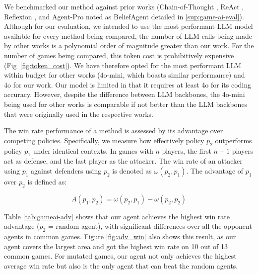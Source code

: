 We benchmarked our method against prior works (Chain-of-Thought \cite{CoT}, ReAct \cite{yao_react_2023}, Reflexion \cite{shinn_reflexion_2023}, and Agent-Pro noted as BeliefAgent \cite{zhang2024agentpro} detailed in \ref{sup:game-ai-eval}).
Although for our evaluation, we intended to use the most performant LLM model available for every method being compared, the number of LLM calls being made by other works is a polynomial order of magnitude greater than our work. For the number of games being compared, this token cost is prohibitively expensive (Fig~\ref{fig:token_cost}). We have therefore opted for the most performant LLM within budget for other works (4o-mini, which boasts similar performance) and 4o for our work. Our model is limited in that it requires at least 4o for its coding accuracy. However, despite the difference between LLM backbones, the 4o-mini being used for other works is comparable if not better than the LLM backbones that were originally used in the respective works.


The win rate performance of a method is assessed by its advantage over competing policies. Specifically, we measure how effectively policy \( p_2 \) outperforms policy \( p_1 \) under identical contexts. In games with \( n \) players, the first \( n-1 \) players act as defense, and the last player as the attacker. The win rate of an attacker using \( p_1 \) against defenders using \( p_2 \) is denoted as \( \omega(p_2, p_1) \). The advantage of \( p_1 \) over \( p_2 \) is defined as:

\begin{equation} 
    A(p_1, p_2) = \omega(p_2, p_1) - \omega(p_2, p_2)
\end{equation}




Table \ref{tab:gameai-adv} shows that our agent achieves the highest win rate advantage ($p_2$ = random agent), with significant differences over all the opponent agents in common games. Figure \ref{fig:adv_win} also shows this result, as our agent covers the largest area and got the highest win rate on 10 out of 13 common games. For mutated games, our agent not only achieves the highest average win rate but also is the only agent that can beat the random agents.


